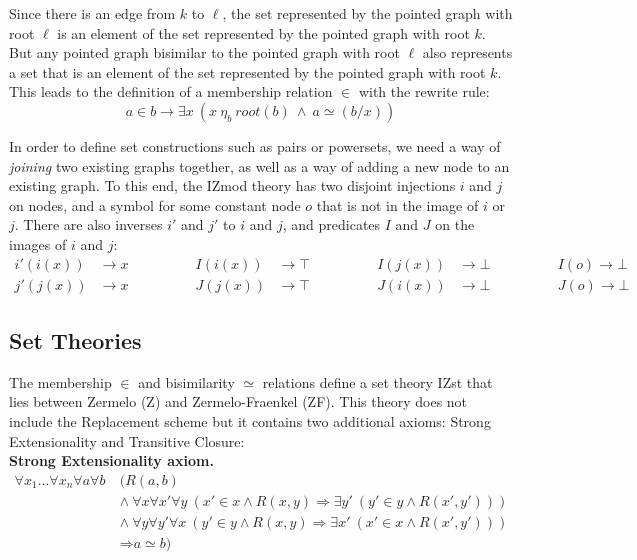 \documentclass[submission,copyright,creativecommons]{eptcs}
\def\lra{\longrightarrow}
\def\imp{\mathbin{\Rightarrow}}
\def\fa{{\forall}}
\def\conj{\mathbin{\wedge}}
\def\ex{{\exists}}
\begin{document}
Since there is an edge from $k$ to $\ell$, the set represented by the pointed graph with root $\ell$ is an element of the set represented by the pointed graph with root $k$. But any pointed graph bisimilar to the pointed graph with root $\ell$ also represents a set that is an element of the set represented by the pointed graph with root $k$. This leads to the definition of a membership relation $\in$ with the rewrite rule:
$$a \in b \lra \ex x~(x~\eta_b~root(b)~\conj~a \simeq (b/x))$$

In order to define set constructions such as pairs or powersets, we need a way of \textit{joining} two existing graphs together, as well as a way of adding a new node to an existing graph. To this end, the IZmod theory has two disjoint injections $i$ and $j$ on nodes, and a symbol for some constant node $o$ that is not in the image of $i$ or $j$. There are also inverses $i'$ and $j'$ to $i$ and $j$, and predicates $I$ and $J$ on the images of $i$ and $j$:
\begin{align*}
i'(i(x)) &\lra x &\qquad\qquad I(i(x)) &\lra \top &\qquad\qquad I(j(x)) &\lra \bot &\qquad\qquad I(o) \lra \bot\\
j'(j(x)) &\lra x &\qquad\qquad J(j(x)) &\lra \top &\qquad\qquad J(i(x)) &\lra \bot &\qquad\qquad J(o) \lra \bot
\end{align*}

\subsection{Set Theories}

The membership $\in$ and bisimilarity $\simeq$ relations define a set theory IZst that lies between Zermelo (Z) and Zermelo-Fraenkel (ZF). This theory does not include the Replacement scheme but it contains two additional axioms: Strong Extensionality and Transitive Closure:\\

\textbf{Strong Extensionality axiom.} 
\begin{equation*}
\begin{split}
\fa x_1...\fa x_n\fa a\fa b~ &(R(a, b) \\
&\conj~\fa x\fa x'\fa y~(x' \in x \conj R(x, y) \imp \ex y'~(y' \in y \conj R(x', y'))) \\
&\conj~\fa y\fa y'\fa x~(y' \in y \conj R(x, y) \imp \ex x'~(x' \in x \conj R(x', y'))) \\
&\imp a \simeq b) 
\end{split}
\end{equation*}
\end{document}
